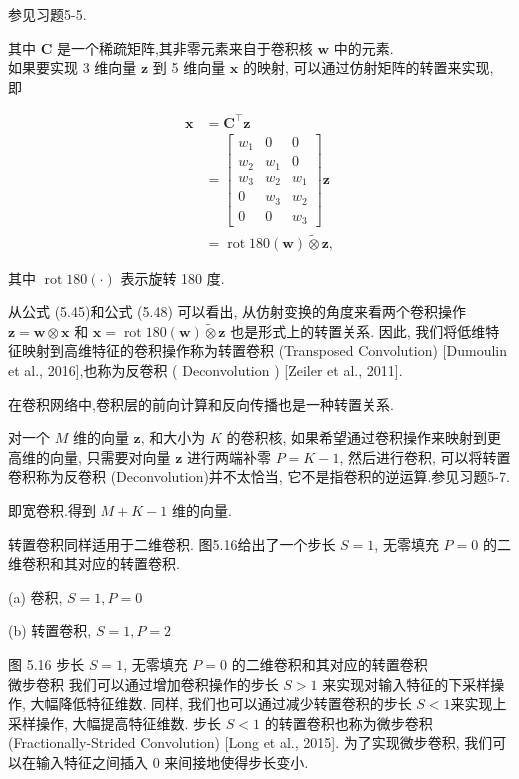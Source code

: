 \documentclass[10pt]{article}
\begin{document}
参见习题5-5.

其中 $\boldsymbol{C}$ 是一个稀疏矩阵,其非零元素来自于卷积核 $\boldsymbol{w}$ 中的元素.\\
如果要实现 3 维向量 $\boldsymbol{z}$ 到 5 维向量 $\boldsymbol{x}$ 的映射, 可以通过仿射矩阵的转置来实现, 即


\begin{align*}
\boldsymbol{x} & =\boldsymbol{C}^{\top} \boldsymbol{z}  \tag{5.47}\\
& =\left[\begin{array}{ccc}
w_{1} & 0 & 0 \\
w_{2} & w_{1} & 0 \\
w_{3} & w_{2} & w_{1} \\
0 & w_{3} & w_{2} \\
0 & 0 & w_{3}
\end{array}\right] \boldsymbol{z}  \tag{5.48}\\
& =\operatorname{rot} 180(\boldsymbol{w}) \tilde{\otimes} \boldsymbol{z}, \tag{5.49}
\end{align*}


其中 $\operatorname{rot} 180(\cdot)$ 表示旋转 180 度.

从公式 (5.45)和公式 (5.48) 可以看出, 从仿射变换的角度来看两个卷积操作 $\boldsymbol{z}=\boldsymbol{w} \otimes \boldsymbol{x}$ 和 $\boldsymbol{x}=\operatorname{rot} 180(\boldsymbol{w}) \tilde{\otimes} \boldsymbol{z}$ 也是形式上的转置关系. 因此, 我们将低维特征映射到高维特征的卷积操作称为转置卷积 (Transposed Convolution) [Dumoulin et al., 2016],也称为反卷积 ( Deconvolution ) [Zeiler et al., 2011].

在卷积网络中,卷积层的前向计算和反向传播也是一种转置关系.

对一个 $M$ 维的向量 $\boldsymbol{z}$, 和大小为 $K$ 的卷积核, 如果希望通过卷积操作来映射到更高维的向量, 只需要对向量 $\boldsymbol{z}$ 进行两端补零 $P=K-1$, 然后进行卷积, 可以将转置卷积称为反卷积 (Deconvolution)并不太恰当, 它不是指卷积的逆运算.参见习题5-7.

即宽卷积.得到 $M+K-1$ 维的向量.

转置卷积同样适用于二维卷积. 图5.16给出了一个步长 $S=1$, 无零填充 $P=0$ 的二维卷积和其对应的转置卷积.



(a) 卷积, $S=1, P=0$



(b) 转置卷积, $S=1, P=2$

图 5.16 步长 $S=1$, 无零填充 $P=0$ 的二维卷积和其对应的转置卷积\\
微步卷积 我们可以通过增加卷积操作的步长 $S>1$ 来实现对输入特征的下采样操作, 大幅降低特征维数. 同样, 我们也可以通过减少转置卷积的步长 $S<1$来实现上采样操作, 大幅提高特征维数. 步长 $S<1$ 的转置卷积也称为微步卷积 (Fractionally-Strided Convolution) [Long et al., 2015]. 为了实现微步卷积, 我们可以在输入特征之间插入 0 来间接地使得步长变小.
\end{document}
